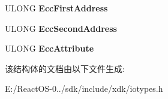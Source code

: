 \begin{DoxyCompactItemize}
\begin{tabbing}
\end{tabbing}\item 
\mbox{\label{struct___p_c_i_x___b_r_i_d_g_e___c_a_p_a_b_i_l_i_t_y_af0f22e97615c6ffb53a7d6712dd24629}} 
U\+L\+O\+NG {\bfseries Ecc\+First\+Address}
\item 
\mbox{\label{struct___p_c_i_x___b_r_i_d_g_e___c_a_p_a_b_i_l_i_t_y_a4d5ba8be0948daec508d2532ac5e131c}} 
U\+L\+O\+NG {\bfseries Ecc\+Second\+Address}
\item 
\mbox{\label{struct___p_c_i_x___b_r_i_d_g_e___c_a_p_a_b_i_l_i_t_y_abd17809171e641c9a7d8cb4c22f6ce7b}} 
U\+L\+O\+NG {\bfseries Ecc\+Attribute}
\end{DoxyCompactItemize}


该结构体的文档由以下文件生成\+:\begin{DoxyCompactItemize}
\item 
E\+:/\+React\+O\+S-\/0../sdk/include/xdk/iotypes.\+h\end{DoxyCompactItemize}
